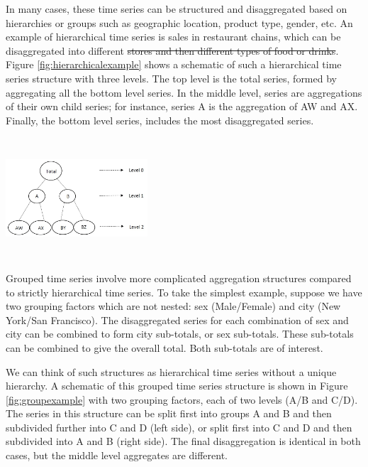 \documentclass[11pt,a4paper,]{article}
\let\origfigure\figure
\let\endorigfigure\endfigure
\renewenvironment{figure}[1][2] {
    \expandafter\origfigure\expandafter[!htbp]
} {
    \endorigfigure
}
\providecommand{\DIFaddtex}[1]{{\protect\color{blue}\uwave{#1}}} %
\providecommand{\DIFdeltex}[1]{{\protect\color{red}\sout{#1}}}                      %
\providecommand{\DIFaddbegin}{} %
\providecommand{\DIFaddend}{} %
\providecommand{\DIFdelbegin}{} %
\providecommand{\DIFdelend}{} %
\providecommand{\DIFadd}[1]{\texorpdfstring{\DIFaddtex{#1}}{#1}} %
\providecommand{\DIFdel}[1]{\texorpdfstring{\DIFdeltex{#1}}{}} %
\newcommand{\DIFscaledelfig}{0.5}
\newlength{\DIFdelgraphicswidth} %
\newlength{\DIFdelgraphicsheight} %
\newcommand{\DIFaddincludegraphics}[2][]{{\color{blue}\fbox{\DIFOincludegraphics[#1]{#2}}}} %
\newcommand{\DIFdelincludegraphics}[2][]{%
\sbox{\DIFdelgraphicsbox}{\DIFOincludegraphics[#1]{#2}}%
\settoboxwidth{\DIFdelgraphicswidth}{\DIFdelgraphicsbox} %
\settoboxtotalheight{\DIFdelgraphicsheight}{\DIFdelgraphicsbox} %
\scalebox{\DIFscaledelfig}{%
\parbox[b]{\DIFdelgraphicswidth}{\usebox{\DIFdelgraphicsbox}\\[-\baselineskip] \rule{\DIFdelgraphicswidth}{0em}}\llap{\resizebox{\DIFdelgraphicswidth}{\DIFdelgraphicsheight}{%
\setlength{\unitlength}{\DIFdelgraphicswidth}%
\begin{picture}(1,1)%
\thicklines\linethickness{2pt} %
{\color[rgb]{1,0,0}\put(0,0){\framebox(1,1){}}}%
{\color[rgb]{1,0,0}\put(0,0){\line( 1,1){1}}}%
{\color[rgb]{1,0,0}\put(0,1){\line(1,-1){1}}}%
\end{picture}%
}\hspace*{3pt}}} %
} %
\DeclareRobustCommand{\DIFaddbegin}{\DIFOaddbegin \let\includegraphics\DIFaddincludegraphics} %
\DeclareRobustCommand{\DIFaddend}{\DIFOaddend \let\includegraphics\DIFOincludegraphics} %
\DeclareRobustCommand{\DIFdelbegin}{\DIFOdelbegin \let\includegraphics\DIFdelincludegraphics} %
\DeclareRobustCommand{\DIFdelend}{\DIFOaddend \let\includegraphics\DIFOincludegraphics} %
\begin{document}
In many cases, these time series can be structured and disaggregated based on hierarchies or groups such as geographic location, product type, gender, etc. An example of hierarchical time series is sales in restaurant chains, which can be disaggregated into different \DIFdelbegin \DIFdel{stores and then different types of food or drinks}\DIFdelend \DIFaddbegin \DIFadd{states and then into different stores}\DIFaddend . Figure \ref{fig:hierarchicalexample} shows a schematic of such a hierarchical time series structure with three levels. The top level is the total series, formed by aggregating all the bottom level series. In the middle level, series are aggregations of their own child series; for instance, series A is the aggregation of AW and AX. Finally, the bottom level series, includes the most disaggregated series.

\begin{figure}

{\centering \includegraphics[width=200px,height=170px,trim=0 0 190 0,clip=true]{Paper-Figures/hierarchical_example}

}

\caption{An example of a two level hierarchical structure.}\label{fig:hierarchicalexample}
\end{figure}

Grouped time series involve more complicated aggregation structures compared to strictly hierarchical time series. To take the simplest example, suppose we have two grouping factors which are not nested: sex (Male/Female) and city (New York/San Francisco). The disaggregated series for each combination of sex and city can be combined to form city sub-totals, or sex sub-totals. These sub-totals can be combined to give the overall total. Both sub-totals are of interest.

We can think of such structures as hierarchical time series without a unique hierarchy. A schematic of this grouped time series structure is shown in Figure \ref{fig:groupexample} with two grouping factors, each of two levels (A/B and C/D). The series in this structure can be split first into groups A and B and then subdivided further into C and D (left side), or split first into C and D and then subdivided into A and B (right side). The final disaggregation is identical in both cases, but the middle level aggregates are different.
\end{document}
